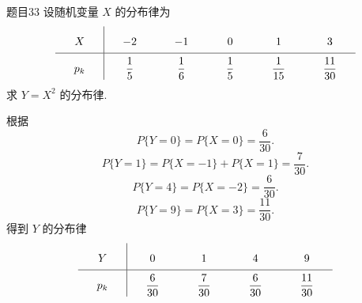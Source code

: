 \begin{question}{题目33}
    设随机变量 $X$ 的分布律为
    $$
        \renewcommand\arraystretch{2}
        \setlength{\arraycolsep}{6mm}
        \begin{array}{c|ccccc}
            X   & -2           & -1           & 0            & 1             & 3              \\
            \hline
            p_k & \dfrac{1}{5} & \dfrac{1}{6} & \dfrac{1}{5} & \dfrac{1}{15} & \dfrac{11}{30} \\
        \end{array}
    $$
    求 $Y=X^2$ 的分布律.
\end{question}
\begin{solution}
    根据
    $$
        P\{Y=0\} = P\{X=0\} = \frac{6}{30}.
    $$
    $$
        P\{Y=1\} = P\{X=-1\} + P\{X=1\} = \frac{7}{30}.
    $$
    $$
        P\{Y=4\} = P\{X=-2\} = \frac{6}{30}.
    $$
    $$
        P\{Y=9\} = P\{X=3\} = \frac{11}{30}.
    $$
    得到 $Y$ 的分布律
    $$
        \renewcommand\arraystretch{2}
        \setlength{\arraycolsep}{6mm}
        \begin{array}{c|cccc}
            Y   & 0             & 1             & 4             & 9              \\
            \hline
            p_k & \dfrac{6}{30} & \dfrac{7}{30} & \dfrac{6}{30} & \dfrac{11}{30}
        \end{array}
    $$
\end{solution}


